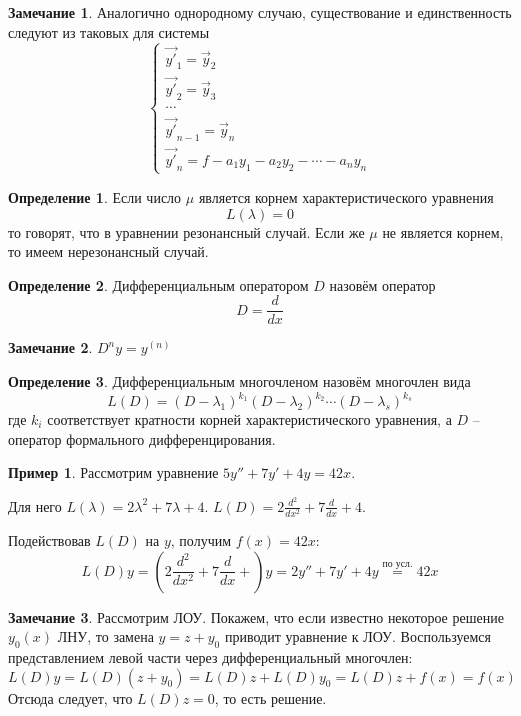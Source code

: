\documentclass[a4paper,12pt]{article}
\theoremstyle{plain}
\theoremstyle{definition}
\newtheorem{definition}{Определение}[section]
\newtheorem*{note}{Замечание}
\newtheorem*{example}{Пример}
\theoremstyle{remark}
\begin{document}
\begin{note}
	Аналогично однородному случаю, существование и единственность следуют из таковых для системы
	\[\begin{cases}
			\vec{y'}_1 = \vec{y}_2     \\
			\vec{y'}_2 = \vec{y}_3     \\
			\cdots                     \\
			\vec{y'}_{n-1} = \vec{y}_n \\
			\vec{y'}_n = f - a_1y_1 - a_2y_2 - \cdots - a_ny_n
		\end{cases}\]
\end{note}

\begin{definition}
	Если число $\mu$ является корнем характеристического уравнения
	\[L(\lambda) = 0\]
	то говорят, что в уравнении резонансный случай. Если же $\mu$ не является корнем, то имеем нерезонансный случай.
\end{definition}

\begin{definition}
	Дифференциальным оператором $D$ назовём оператор
	\[D = \frac{d}{dx}\]
\end{definition}

\begin{note}
	$D^ny = y^{(n)}$
\end{note}

\begin{definition}
	Дифференциальным многочленом назовём многочлен вида
	\[L(D) = (D - \lambda_1)^{k_1}(D - \lambda_2)^{k_2}\cdots(D - \lambda_s)^{k_s}\]
	где $k_i$ соответствует кратности корней характеристического уравнения, а $D$ -- оператор формального дифференцирования.
\end{definition}

\begin{example}
	Рассмотрим уравнение $5y'' + 7y' + 4y = 42x$.

	Для него $L(\lambda) = 2\lambda^2 + 7\lambda + 4$. $L(D) = 2\frac{d^2}{dx^2} + 7\frac{d}{dx} + 4$.

	Подействовав $L(D)$ на $y$, получим $f(x) = 42x$:
	\[L(D)y = \left(2\frac{d^2}{dx^2} + 7\frac{d}{dx} + \right)y = 2y'' + 7y' + 4y \overset{\text{по усл.}}{=} 42x\]
\end{example}

\begin{note}
	Рассмотрим ЛОУ. Покажем, что если известно некоторое решение $y_0(x)$ ЛНУ, то замена $y = z + y_0$ приводит уравнение к ЛОУ. Воспользуемся представлением левой части через дифференциальный многочлен:
	\[L(D)y = L(D)(z + y_0) = L(D)z + L(D)y_0 = L(D)z + f(x) = f(x)\]
	Отсюда следует, что $L(D)z = 0$, то есть решение.
\end{note}
\end{document}
